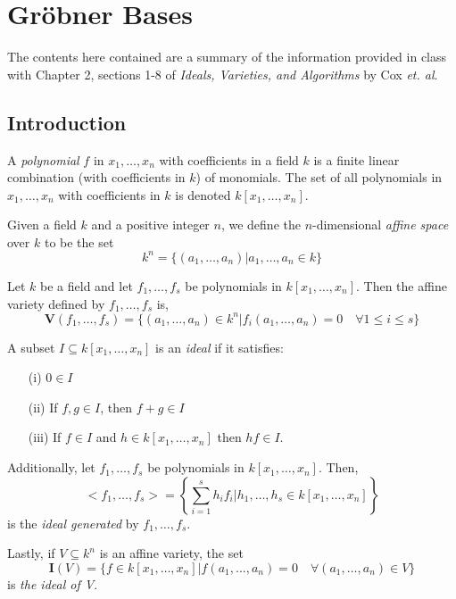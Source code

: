 \section{Gr\"obner Bases}

The contents here contained are a summary of the information provided in class with Chapter 2, sections 1-8 of \textit{Ideals, Varieties, and Algorithms} by Cox \textit{et. al}.

\subsection{Introduction}

\begin{definition}[Polynomial]
    A \textit{polynomial} $f$ in $x_1, \dots, x_n$ with coefficients in a field $k$ is a finite linear combination (with coefficients in $k$) of monomials.
    The set of all polynomials in $x_1, \dots, x_n$ with coefficients in $k$ is denoted $k[x_1, \dots, x_n]$.
\end{definition}

\begin{definition}
    Given a field $k$ and a positive integer $n$, we define the $n$-dimensional \textit{affine space} over $k$ to be the set
    $$k^n = \{ (a_1, \dots, a_n) | a_1, \dots, a_n \in k \}$$
\end{definition}

\begin{definition}
    Let $k$ be a field and let $f_1, \dots, f_s$ be polynomials in $k[x_1, \dots, x_n]$.
    Then the affine variety defined by $f_1, \dots, f_s$ is,
    $$\pmb{V}(f_1, \dots, f_s) = \{ (a_1, \dots, a_n) \in k^n | f_i(a_1, \dots, a_n) = 0 \quad \forall 1 \leq i \leq s \}$$
\end{definition}

\begin{definition}[Ideals]
    A subset $I \subseteq k[x_1, \dots, x_n]$ is an \textit{ideal} if it satisfies:
    \begin{enumerate}
        \item[(i)] $0 \in I$
        \item[(ii)] If $f, g \in I$, then $f + g \in I$
        \item[(iii)] If $f \in I$ and $h \in k[x_1, \dots, x_n]$ then $hf \in I$.
    \end{enumerate}
    Additionally, let $f_1, \dots, f_s$ be polynomials in $k[x_1, \dots, x_n]$.
    Then,
    $$<f_1, \dots, f_s> = \left\{ \sum_{i=1}^s h_i f_i | h_1, \dots, h_s \in k[x_1, \dots, x_n] \right\}$$
    is the \textit{ideal generated} by $f_1, \dots, f_s$.

    Lastly, if $V \subseteq k^n$ is an affine variety, the set
    $$\pmb{I}(V) = \{f \in k[x_1, \dots, x_n] | f(a_1, \dots, a_n) = 0 \quad \forall (a_1, \dots, a_n) \in V\}$$
    is \textit{the ideal of V}.
\end{definition}
